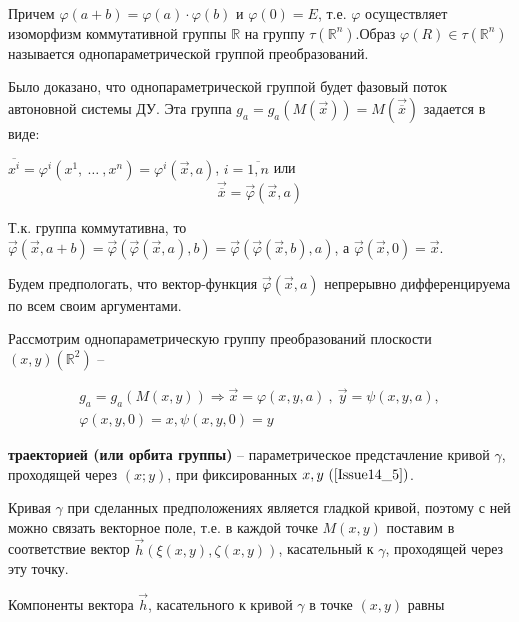 Причем $\varphi(a+b) = \varphi(a)\cdot \varphi(b)$ и $\varphi(0) = E$, т.е. $\varphi$ осуществляет изоморфизм коммутативной группы $\mathbb{R}$ на группу $\tau(\mathbb{R}^n)$.Образ $\varphi(R) \in \tau(\mathbb{R}^n)$ называется однопараметрической группой преобразований.

Было доказано, что однопараметрической группой будет фазовый поток автоновной системы ДУ. Эта группа $g_a = g_a(M(\vec{x})) = M(\overrightarrow{\overline{x}})$ задается в виде:

$\overline{x^i} = \varphi^i(x^1,\ \dots\ ,x^n) = \varphi^i(\vec{x}, a)$, $i = \overline{1, n}$ или 
\begin{equation}
	\overrightarrow{\overline{x}} = \vec{\varphi}(\vec{x}, a)
	\label{Issue14_4}
\end{equation}

Т.к. группа коммутативна, то $\vec{\varphi}(\vec{x}, a + b) = \vec{\varphi}(\vec{\varphi}(\vec{x}, a), b) = \vec{\varphi}(\vec{\varphi}(\vec{x}, b), a)$, а $\vec{\varphi}(\vec{x}, 0) = \vec{x}$.

Будем предпологать, что вектор-функция $\vec{\varphi}(\vec{x}, a)$ непрерывно дифференцируема по всем своим аргументами.

Рассмотрим однопараметрическую группу преобразований плоскости $(x,y)(\mathbb{R}^2)$ --

\begin{equation}
	\begin{gathered}
		g_a = g_a(M(x,y)) \Rightarrow \vec{x} = \varphi(x,y,a)\ ,\ \vec{y} = \psi(x,y,a),\\
		\varphi(x,y,0) = x, \psi(x,y,0) = y
	\end{gathered}	
	\label{Issue14_5}
\end{equation}


\begin{definition}

\textbf{траекторией (или орбита группы)} -- параметрическое предстачление кривой $\gamma$, проходящей через $(x;y)$, при фиксированных $x,y\ (\ref{Issue14_5})$.

\end{definition}


Кривая $\gamma$ при сделанных предположениях является $\textbf{гладкой кривой}$, поэтому с ней можно связать векторное поле, т.е. в каждой точке $M(x,y)$ поставим в соответствие вектор $\vec{h}(\xi(x,y), \zeta(x,y))$, касательный к $\gamma$, проходящей через эту точку.

Компоненты вектора $\vec{h}$, касательного к кривой $\gamma$ в точке $(x,y)$ равны

